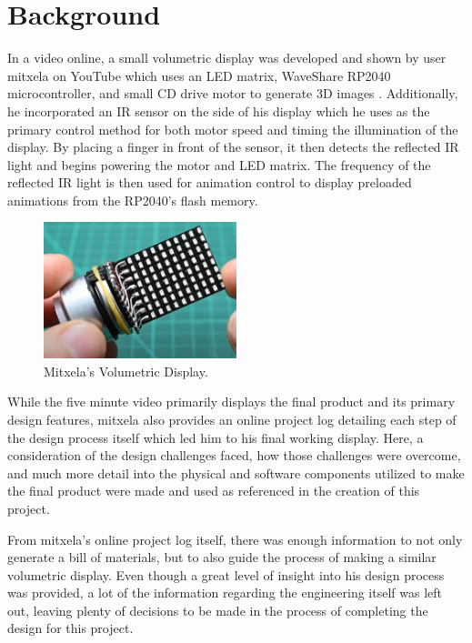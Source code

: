 \documentclass[11pt,journal]{IEEEtran}
\begin{document}



\section{Background}

In a video online, a small volumetric display was developed and shown by user mitxela on YouTube which uses an LED matrix, WaveShare RP2040 microcontroller, and small CD drive motor to generate 3D images \cite{mitxela_candle}. Additionally, he incorporated an IR sensor on the side of his display which he uses as the primary control method for both motor speed and timing the illumination of the display. By placing a finger in front of the sensor, it then detects the reflected IR light and begins powering the motor and LED matrix. The frequency of the reflected IR light is then used for animation control to display preloaded animations from the RP2040’s flash memory. 

\begin{figure}[h]
    \centering
    \includegraphics[width=0.5\textwidth]{Mitxela Display.png}
   
    \caption{Mitxela's Volumetric Display.}
    \label{fig: mitxela display}
\end{figure}

While the five minute video primarily displays the final product and its primary design features, mitxela also provides an online project log detailing each step of the design process itself which led him to his final working display. Here, a consideration of the design challenges faced, how those challenges were overcome, and much more detail into the physical and software components utilized to make the final product were made and used as referenced in the creation of this project. 

From mitxela’s online project log itself, there was enough information to not only generate a bill of materials, but to also guide the process of making a similar volumetric display. Even though a great level of insight into his design process was provided, a lot of the information regarding the engineering itself was left out, leaving plenty of decisions to be made in the process of completing the design for this project.
\end{document}
